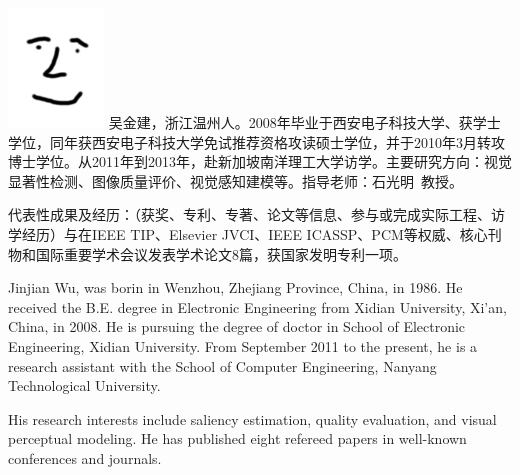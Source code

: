 
\begin{cauthorbio}{\includegraphics[height=1.25in]{photo}}
吴金建，浙江温州人。2008年毕业于西安电子科技大学、获学士学位，同年获西安电子科技大学免试推荐资格攻读硕士学位，并于2010年3月转攻博士学位。从2011年到2013年，赴新加坡南洋理工大学访学。主要研究方向：视觉显著性检测、图像质量评价、视觉感知建模等。指导老师：石光明~教授。

代表性成果及经历：（获奖、专利、专著、论文等信息、参与或完成实际工程、访学经历）与在IEEE TIP、Elsevier JVCI、IEEE ICASSP、PCM等权威、核心刊物和国际重要学术会议发表学术论文8篇，获国家发明专利一项。
\vspace{1cm}
\end{cauthorbio}


\begin{eauthorbio}  
\hspace{0.6cm} Jinjian Wu, was borin in Wenzhou, Zhejiang Province, China, in 1986. He received the B.E. degree in Electronic Engineering from Xidian University, Xi'an, China, in 2008. He is pursuing the degree of doctor in School of Electronic Engineering, Xidian University. From September 2011 to the present, he is a research assistant with the School of Computer Engineering, Nanyang Technological University.

His research interests include saliency estimation, quality evaluation, and visual 
perceptual modeling. He has published eight refereed papers in well-known conferences and journals.
\end{eauthorbio}


